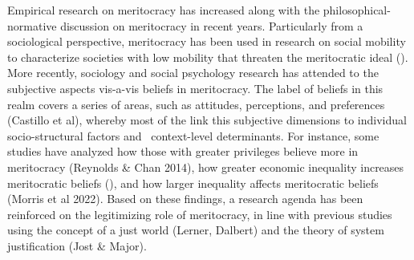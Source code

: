 \documentclass[
  letterpaper,
  DIV=11,
  numbers=noendperiod]{scrartcl}
\begin{document}
Empirical research on meritocracy has increased along with the
philosophical-normative discussion on meritocracy in recent years.
Particularly from a sociological perspective, meritocracy has been used
in research on social mobility to characterize societies with low
mobility that threaten the meritocratic ideal
(). More recently,
sociology and social psychology research has attended to the subjective
aspects vis-a-vis beliefs in meritocracy. The label of beliefs in this
realm covers a series of areas, such as attitudes, perceptions, and
preferences (Castillo et al), whereby most of the link this subjective
dimensions to individual socio-structural factors and~ context-level
determinants. For instance, some studies have analyzed how those with
greater privileges believe more in meritocracy (Reynolds \& Chan 2014),
how greater economic inequality increases meritocratic beliefs
(), and
how larger inequality affects meritocratic beliefs (Morris et al 2022).
Based on these findings, a research agenda has been reinforced on the
legitimizing role of meritocracy, in line with previous studies using
the concept of a just world (Lerner, Dalbert) and the theory of system
justification (Jost \& Major).
\end{document}
